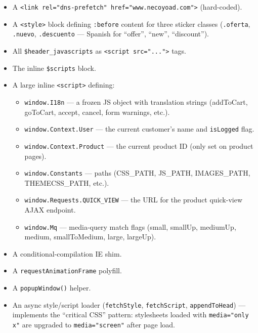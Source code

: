 \documentclass[11pt,a4paper]{article}
\begin{document}
\begin{itemize}[leftmargin=1.6em,itemsep=2pt]
  \item A \texttt{<link rel="dns-prefetch" href="www.necoyoad.com">}
        (hard-coded).
  \item A \texttt{<style>} block defining \texttt{:before} content
        for three sticker classes (\texttt{.oferta}, \texttt{.nuevo},
        \texttt{.descuento} --- Spanish for ``offer'', ``new'',
        ``discount'').
  \item All \texttt{\$header\_javascripts} as
        \texttt{<script src="...">} tags.
  \item The inline \texttt{\$scripts} block.
  \item A large inline \texttt{<script>} defining:
        \begin{itemize}[itemsep=2pt]
          \item \texttt{window.I18n} --- a frozen JS object with
                translation strings (addToCart, goToCart, accept,
                cancel, form warnings, etc.).
          \item \texttt{window.Context.User} --- the current
                customer's name and \texttt{isLogged} flag.
          \item \texttt{window.Context.Product} --- the current
                product ID (only set on product pages).
          \item \texttt{window.Constants} --- paths (CSS\_PATH,
                JS\_PATH, IMAGES\_PATH, THEMECSS\_PATH, etc.).
          \item \texttt{window.Requests.QUICK\_VIEW} --- the URL
                for the product quick-view AJAX endpoint.
          \item \texttt{window.Mq} --- media-query match flags
                (small, smallUp, mediumUp, medium, smallToMedium,
                large, largeUp).
        \end{itemize}
  \item A conditional-compilation IE shim.
  \item A \texttt{requestAnimationFrame} polyfill.
  \item A \texttt{popupWindow()} helper.
  \item An async style/script loader (\texttt{fetchStyle},
        \texttt{fetchScript}, \texttt{appendToHead}) --- implements
        the ``critical CSS'' pattern: stylesheets loaded with
        \texttt{media="only x"} are upgraded to
        \texttt{media="screen"} after page load.
\end{itemize}
\end{document}
